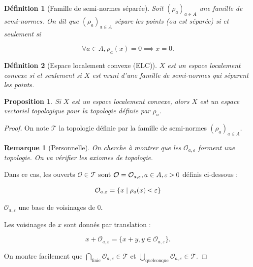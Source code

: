 \documentclass[french]{book}
\newtheorem{prop}{Proposition}[section]
\newtheorem{definition}{Définition}[section]
\newtheorem*{remark}{Remarque}
\newcommand{\lesss}{\rotatebox[origin=c]{90}{$\land$}}
\newcommand{\less}{\ \lesss\ }
\newcommand{\biggg}{\rotatebox[origin=c]{90}{$\lor$}}
\newcommand{\bg}{\ \biggg\ }
\begin{document}
\begin{definition}[Famille de semi-normes séparée]
  Soit $(\rho_a) _{a \in A}$ une famille de semi-normes. On dit que $(\rho_a) _{a \in A}$ sépare les points (ou est séparée) si et seulement si

  \begin{equation*}
    \forall a \in A, \rho_a(x) = 0 \implies x=0.
  \end{equation*}
\end{definition}

\begin{definition}[Espace localement convexe (ELC)]
  $X$ est un espace localement convexe si et seulement si $X$ est muni d'une famille de semi-normes qui séparent les points.
\end{definition}

\begin{prop}
  Si $X$ est un espace localement convexe, alors $X$ est un espace vectoriel topologique pour la topologie définie par $\rho_a$.
\end{prop}


\begin{proof}
  On note $\mathscr{T} $ la topologie définie par la famille de semi-normes $(\rho_a) _{a \in A}$.

  \begin{remark}[Personnelle]
    On cherche à montrer que les $\mathcal{O} _{a, \varepsilon }$ forment une topologie. On va vérifier les axiomes de topologie.
  \end{remark}

  Dans ce cas, les ouverts $\mathcal{O} \in \mathscr{T} $ sont $\mathcal{O} = \mathcal{O} _{a, \varepsilon }, a \in A, \varepsilon  \bg 0$ définis ci-dessous :

  \begin{equation*}
    \mathcal{O} _{a, \varepsilon } = \{ x \mid \rho_a(x) \less \varepsilon  \}
  \end{equation*}

  $\mathcal{O} _{a,\varepsilon }$ une base de voisinages de 0.

  Les voisinages de $x$ sont donnés par translation :

  \begin{equation*}
    x + \mathcal{O} _{a, \varepsilon } = \{ x+y, y \in \mathcal{O} _{a, \varepsilon } \}.
  \end{equation*}

  On montre facilement que $\bigcap_{\text{finie} } \mathcal{O} _{a, \varepsilon } \in \mathscr{T} $ et $\bigcup_{\text{quelconque} } \mathcal{O} _{a, \varepsilon } \in \mathscr{T}  $.
\end{proof}
\end{document}
